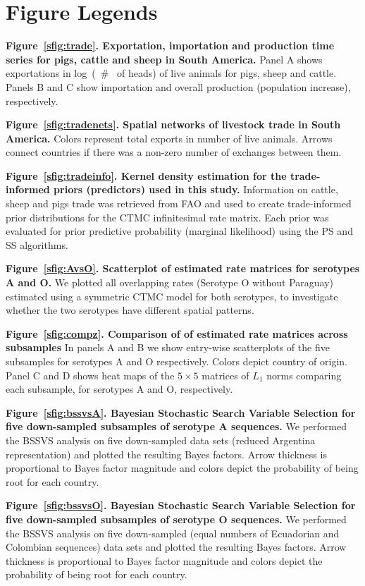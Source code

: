\documentclass[a4paper,10pt]{article}
\begin{document}
\section*{Figure Legends}

\textbf{Figure~\ref{sfig:trade}. Exportation, importation and production time series for pigs, cattle and sheep in South America.}
Panel A shows exportations in log~(~\# ~of heads) of live animals for pigs, sheep and cattle.
Panels B and C show importation and overall production (population increase), respectively.

\textbf{Figure~\ref{sfig:tradenets}. Spatial networks of livestock trade in South America.}
Colors represent total exports in number of live animals.
Arrows connect countries if there was a non-zero number of exchanges between them.

\textbf{Figure~\ref{sfig:tradeinfo}. Kernel density estimation for the trade-informed priors (predictors) used in this study.}
Information on cattle, sheep and pigs trade was retrieved from FAO and used to create trade-informed prior distributions for the CTMC infinitesimal rate matrix.
Each prior was evaluated for prior predictive probability (marginal likelihood) using the PS and SS algorithms. 

\textbf{Figure~\ref{sfig:AvsO}. Scatterplot of estimated rate matrices for serotypes A and O.}
We plotted all overlapping rates (Serotype O without Paraguay) estimated using a symmetric CTMC model for both serotypes, to investigate whether the two serotypes have different spatial patterns.

\textbf{Figure~\ref{sfig:compz}. Comparison of of estimated rate matrices across subsamples}
In panels A and B we show entry-wise scatterplots of the five subsamples for serotypes A and O respectively.
Colors depict country of origin.
Panel C and D shows heat maps of the $5\times5$ matrices of $L_1$ norms comparing each subsample, for serotypes A and O, respectively.

\textbf{Figure~\ref{sfig:bssvsA}. Bayesian Stochastic Search Variable Selection for five down-sampled subsamples of serotype A sequences.}
We performed the BSSVS analysis on five down-sampled data sets (reduced Argentina representation) and plotted the resulting Bayes factors.
Arrow thickness is proportional to Bayes factor magnitude and colors depict the probability of being root for each country.

\textbf{Figure~\ref{sfig:bssvsO}. Bayesian Stochastic Search Variable Selection for five down-sampled subsamples of serotype O sequences.}
We performed the BSSVS analysis on five down-sampled (equal numbers of Ecuadorian and Colombian sequences) data sets and  plotted the resulting Bayes factors.
Arrow thickness is proportional to Bayes factor magnitude and colors depict the probability of being root for each country.
\end{document}
